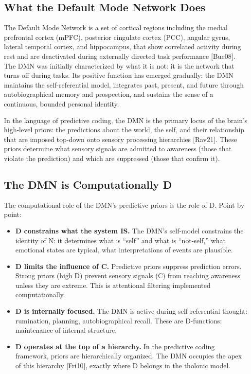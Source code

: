 \documentclass[12pt]{article}
\providecommand{\tightlist}{%
  \setlength{\itemsep}{0pt}\setlength{\parskip}{0pt}}
\begin{document}
\subsection{What the Default Mode Network Does}\label{what-the-default-mode-network-does}

The Default Mode Network is a set of cortical regions including the
medial prefrontal cortex (mPFC), posterior cingulate cortex (PCC),
angular gyrus, lateral temporal cortex, and hippocampus, that show
correlated activity during rest and are deactivated during externally
directed task performance {[}Buc08{]}. The DMN was initially
characterized by what it is not: it is the network that turns off during
tasks. Its positive function has emerged gradually: the DMN maintains
the self-referential model, integrates past, present, and future through
autobiographical memory and prospection, and sustains the sense of a
continuous, bounded personal identity.

In the language of predictive coding, the DMN is the primary locus of
the brain's high-level priors: the predictions about the world, the
self, and their relationship that are imposed top-down onto sensory
processing hierarchies {[}Rav21{]}. These priors determine what sensory
signals are admitted to awareness (those that violate the prediction)
and which are suppressed (those that confirm it).

\subsection{The DMN is Computationally D}\label{the-dmn-is-computationally-d}

The computational role of the DMN's predictive priors is the role of D.
Point by point:

\begin{itemize}
\tightlist
\item
  \textbf{D constrains what the system IS.} The DMN's self-model
  constrains the identity of N: it determines what is ``self'' and what
  is ``not-self,'' what emotional states are typical, what
  interpretations of events are plausible.
\item
  \textbf{D limits the influence of C.} Predictive priors suppress
  prediction errors. Strong priors (high D) prevent sensory signals (C)
  from reaching awareness unless they are extreme. This is attentional
  filtering implemented computationally.
\item
  \textbf{D is internally focused.} The DMN is active during
  self-referential thought: rumination, planning, autobiographical
  recall. These are D-functions: maintenance of internal structure.
\item
  \textbf{D operates at the top of a hierarchy.} In the predictive
  coding framework, priors are hierarchically organized. The DMN
  occupies the apex of this hierarchy {[}Fri10{]}, exactly where D
  belongs in the tholonic model.
\end{itemize}
\end{document}
